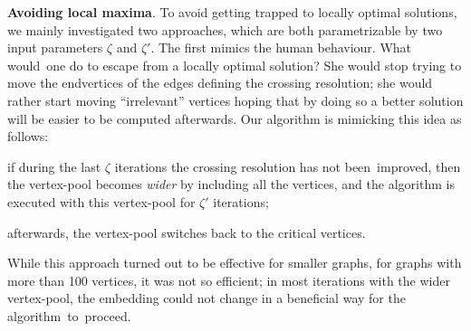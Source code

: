 \documentclass[runningheads]{llncs}
\newcommand{\myparagraph}[1]{\smallskip\noindent\textbf{#1}.}
\begin{document}
\myparagraph{Avoiding local maxima}
%
To avoid getting trapped to locally optimal solutions, we mainly investigated two approaches, which are both  parametrizable by two input parameters $\zeta$ and $\zeta'$. The first mimics the human behaviour. What would~one do to escape from a locally optimal solution? She would stop trying to move the endvertices of the edges defining the crossing resolution; she would rather start moving ``irrelevant'' vertices hoping that
by doing so a better solution will be easier to be computed afterwards. Our algorithm is mimicking this idea as follows:
%
\begin{inparaenum}[(i)]
\item if during the last $\zeta$ iterations the crossing resolution has not been~improved, then the vertex-pool becomes \emph{wider} by including all the vertices, and the algorithm is executed with this vertex-pool for $\zeta'$ iterations;
\item afterwards, the vertex-pool switches back to the critical vertices.
\end{inparaenum}
%
While this approach turned out to be effective for smaller graphs, for graphs with more than 100 vertices, it was not so efficient; in most iterations with the wider vertex-pool, the embedding could not change in a beneficial way for the algorithm~to~proceed.

\end{document}
